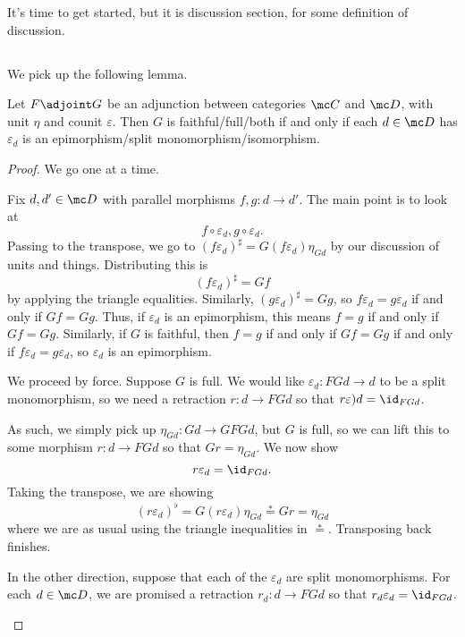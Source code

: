 \documentclass[../notes.tex]{subfiles}
\begin{document}

It's time to get started, but it is discussion section, for some definition of discussion.

\subsection{}
We pick up the following lemma.
\begin{lemma}
	Let $F\adjoint G$ be an adjunction between categories $\mc C$ and $\mc D$, with unit $\eta$ and counit $\varepsilon$. Then $G$ is faithful/full/both if and only if each $d\in\mc D$ has $\varepsilon_d$ is an epimorphism/split monomorphism/isomorphism.
\end{lemma}
\begin{proof}
	We go one at a time.
	\begin{listroman}
		\item Fix $d,d'\in\mc D$ with parallel morphisms $f,g\colon d\to d'$. The main point is to look at
		\[f\circ\varepsilon_d,g\circ\varepsilon_d.\]
		Passing to the transpose, we go to $(f\varepsilon_d)^\sharp=G(f\varepsilon_d)\eta_{Gd}$ by our discussion of units and things. Distributing this is
		\[(f\varepsilon_d)^\sharp=Gf\]
		by applying the triangle equalities. Similarly, $(g\varepsilon_d)^\sharp=Gg$, so $f\varepsilon_d=g\varepsilon_d$ if and only if $Gf=Gg$. Thus, if $\varepsilon_d$ is an epimorphism, this means $f=g$ if and only if $Gf=Gg$. Similarly, if $G$ is faithful, then $f=g$ if and only if $Gf=Gg$ if and only if $f\varepsilon_d=g\varepsilon_d$, so $\varepsilon_d$ is an epimorphism.
		\item We proceed by force. Suppose $G$ is full. We would like $\varepsilon_d\colon FGd\to d$ to be a split monomorphism, so we need a retraction $r\colon d\to FGd$ so that $r\varepsilon)d=\id_{FGd}$.

		As such, we simply pick up $\eta_{Gd}\colon Gd\to GFGd$, but $G$ is full, so we can lift this to some morphism $r\colon d\to FGd$ so that $Gr=\eta_{Gd}$. We now show
		\[r\varepsilon_d=\id_{FGd}.\]
		Taking the transpose, we are showing
		\[(r\varepsilon_d)^\flat=G(r\varepsilon_d)\eta_{Gd}\stackrel*=Gr=\eta_{Gd}\]
		where we are as usual using the triangle inequalities in $\stackrel*=$. Transposing back finishes.

		In the other direction, suppose that each of the $\varepsilon_d$ are split monomorphisms. For each $d\in\mc D$, we are promised a retraction $r_d\colon d\to FGd$ so that $r_d\varepsilon_d=\id_{FGd}$.


\end{listroman}
\end{proof}
\end{document}
